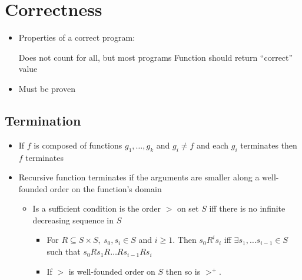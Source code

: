 
\section{Correctness}
\begin{itemize}
    \item Properties of a correct program:
        \begin{itemize}
             Does not count for all, but most programs
             Function should return ``correct'' value
        \end{itemize}
    \item Must be proven
\end{itemize}

\subsection{Termination}
\begin{itemize}
    \item If $f$ is composed of functions $g_1, \dots , g_k$ and $g_i \neq f$ and each $g_i$ terminates then $f$ terminates
    \item Recursive function terminates if the arguments are smaller along a well-founded order on the function's domain
        \begin{itemize}
            \item Is a sufficient condition
             is the order $>$ on set $S$ iff there is no infinite decreasing sequence in $S$
                \begin{itemize}
                     of two binary relation $R_1, R_2$ on set $S$ is $R_2 \circ R_1 \equiv \{(a, c) \in S \times S \mid \exists b \in S. a R_1 b \wedge b R_2 c\}$
                        \begin{itemize}
                            \item For $R \subset S \times S$:
                                \begin{itemize}
                                    \item $R^1 \equiv R$
                                    \item $R^{n + 1} \equiv R \circ R^n, n \ge 1$
                                    \item $R^+ \equiv \bigcup_{n \ge 1} R^n$
                                \end{itemize}
                        \end{itemize}
                    \item For $R \subseteq S \times S,\ s_0, s_i \in S$ and $i \ge 1$. Then $s_0 R^i s_i$ iff $\exists s_1, \dots s_{i-1} \in S$ such that $s_0 R s_1 R \dots R s_{i-1} R s_i$
                    \item If $>$ is well-founded order on $S$ then so is $>^+$.
                \end{itemize}
        \end{itemize}
\end{itemize}

